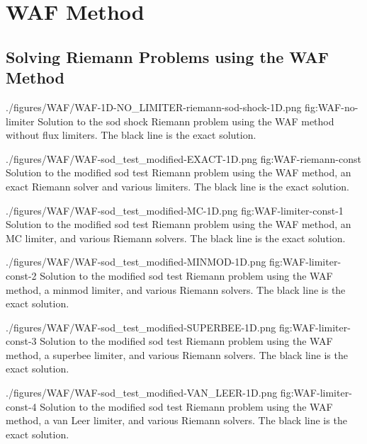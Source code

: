 \section{WAF Method}




\subsection{Solving Riemann Problems using the WAF Method}


\quickfigcap
	{./figures/WAF/WAF-1D-NO_LIMITER-riemann-sod-shock-1D.png}
	{fig:WAF-no-limiter}
	{
		Solution to the sod shock Riemann problem using the WAF method without flux limiters.
		The black line is the exact solution.
	}




\quickfigcap
	{./figures/WAF/WAF-sod_test_modified-EXACT-1D.png}
	{fig:WAF-riemann-const}
	{
		Solution to the modified sod test Riemann problem using the WAF method, an exact Riemann solver and various limiters.
		The black line is the exact solution.
	}


\quickfigcap
	{./figures/WAF/WAF-sod_test_modified-MC-1D.png}
	{fig:WAF-limiter-const-1}
	{
		Solution to the modified sod test Riemann problem using the WAF method, an MC limiter, and  various Riemann solvers.
		The black line is the exact solution.
	}

\quickfigcap
	{./figures/WAF/WAF-sod_test_modified-MINMOD-1D.png}
	{fig:WAF-limiter-const-2}
	{
		Solution to the modified sod test Riemann problem using the WAF method, a minmod limiter, and  various Riemann solvers.
		The black line is the exact solution.
	}

\quickfigcap
	{./figures/WAF/WAF-sod_test_modified-SUPERBEE-1D.png}
	{fig:WAF-limiter-const-3}
	{
		Solution to the modified sod test Riemann problem using the WAF method, a superbee limiter, and  various Riemann solvers.
		The black line is the exact solution.
	}

\quickfigcap
	{./figures/WAF/WAF-sod_test_modified-VAN_LEER-1D.png}
	{fig:WAF-limiter-const-4}
	{
		Solution to the modified sod test Riemann problem using the WAF method, a van Leer limiter, and various Riemann solvers.
		The black line is the exact solution.
	}







